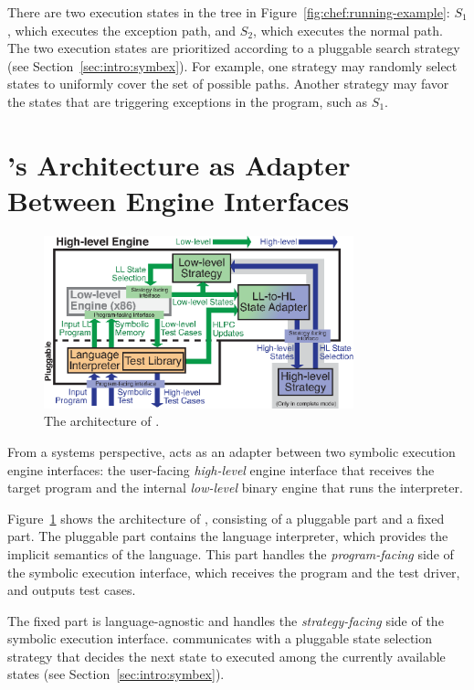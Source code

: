 There are two execution states in the tree in Figure~\ref{fig:chef:running-example}: $S_1$, which executes the exception path, and $S_2$, which executes the normal path.
%
The two execution states are prioritized according to a pluggable search strategy (see Section~\ref{sec:intro:symbex}).  For example, one strategy may randomly select states to uniformly cover the set of possible paths.  Another strategy may favor the states that are triggering exceptions in the program, such as $S_1$.


\section{\chef's Architecture as Adapter Between Engine Interfaces}

\begin{figure}
  \centering
  \includegraphics[width=0.8\textwidth]{figures/chef/iface-adapter}
  \caption{The architecture of \chef.}
  \label{fig:chef:arch}
\end{figure}

From a systems perspective, \chef acts as an adapter between two symbolic execution engine interfaces:
%
the user-facing \emph{high-level} engine interface that receives the target program and the internal \emph{low-level} binary engine that runs the interpreter.

Figure~\ref{fig:chef:arch} shows the architecture of \chef, consisting of a pluggable part and a fixed part.
%
The pluggable part contains the language interpreter, which provides the implicit semantics of the language.  This part handles the \emph{program-facing} side of the symbolic execution interface, which receives the program and the test driver, and outputs test cases.

The fixed part is language-agnostic and handles the \emph{strategy-facing} side of the symbolic execution interface.
%
\chef communicates with a pluggable state selection strategy that decides the next state to executed among the currently available states (see Section~\ref{sec:intro:symbex}).


